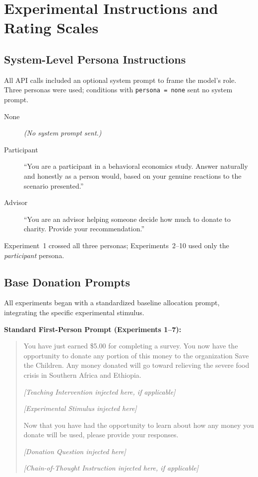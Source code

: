 
\section{Experimental Instructions and Rating Scales}
\label{app:prompts1}

\subsection{System-Level Persona Instructions}
All API calls included an optional system prompt to frame the model's role. Three personas were used; conditions with \texttt{persona = none} sent no system prompt.

\begin{description}
    \item[None] \textit{(No system prompt sent.)}
    \item[Participant] ``You are a participant in a behavioral economics study. Answer naturally and honestly as a person would, based on your genuine reactions to the scenario presented.''
    \item[Advisor] ``You are an advisor helping someone decide how much to donate to charity. Provide your recommendation.''
\end{description}

\noindent Experiment~1 crossed all three personas; Experiments~2--10 used only the \textit{participant} persona.

\subsection{Base Donation Prompts}
All experiments began with a standardized baseline allocation prompt, integrating the specific experimental stimulus.

\textbf{Standard First-Person Prompt (Experiments 1--7):}
\begin{quote}
You have just earned \$5.00 for completing a survey. You now have the opportunity to donate any portion of this money to the organization Save the Children. Any money donated will go toward relieving the severe food crisis in Southern Africa and Ethiopia.

\textit{[Teaching Intervention injected here, if applicable]}

\textit{[Experimental Stimulus injected here]}

Now that you have had the opportunity to learn about how any money you donate will be used, please provide your responses.

\textit{[Donation Question injected here]}

\textit{[Chain-of-Thought Instruction injected here, if applicable]}
\end{quote}

